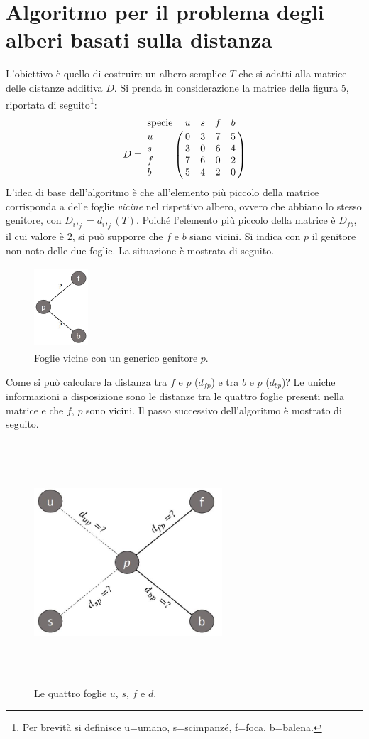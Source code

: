 \section{Algoritmo per il problema degli alberi basati sulla distanza}
L'obiettivo è quello di costruire un albero semplice $T$ che si adatti alla matrice delle distanze additiva $D$.
\newline
Si prenda in considerazione la matrice della figura 5, riportata di seguito\footnote{Per brevità si definisce u=umano, s=scimpanzé, f=foca, b=balena.}:
\[
D = \bordermatrix{\text{specie}&u&s&f&b\cr
                u& 0 & 3 & 7 & 5\cr
                s& 3 & 0 & 6 & 4\cr
                f& 7 & 6 & 0 & 2\cr
                b& 5 & 4 & 2 & 0}
\]
\newline
L'idea di base dell'algoritmo è che all'elemento più piccolo della matrice corrisponda a delle foglie \textit{vicine} nel rispettivo albero, ovvero che abbiano lo stesso genitore, con $D_i,_j=d_i,_j(T)$.
\newline
Poiché l'elemento più piccolo della matrice è $D_{fb}$, il cui valore è $2$, si può supporre che $f$ e $b$ siano vicini. Si indica con $p$ il genitore non noto delle due foglie. La situazione è mostrata di seguito.
\begin{figure}[h!]
\centering
	\includegraphics[height=3cm, width=2cm]{distance_between_f_b.jpg}
 	\caption{Foglie vicine con un generico genitore $p$.}
  	\label{fig:neighborsleaves}
\end{figure}
\newline
Come si può calcolare la distanza tra $f$ e $p$ ($d_{fp}$) e tra $b$ e $p$ ($d_{bp}$)? Le uniche informazioni a disposizione sono le distanze tra le quattro foglie presenti nella matrice e che $f$, $p$ sono vicini. Il passo successivo dell'algoritmo è mostrato di seguito.
\begin{figure}[h!]
\centering
	\includegraphics[height=9cm, width=7cm, keepaspectratio]{distance_between_f_b_part_2.jpg}
 	\caption{Le quattro foglie $u$, $s$, $f$ e $d$.}
  	\label{fig:neighborsleaves_2}
\end{figure}
